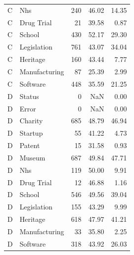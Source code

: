 \begin{tabular}{llrrr}
C & Nhs & 240 & 46.02 & 14.35 \\
C & Drug Trial & 21 & 39.58 & 0.87 \\
C & School & 430 & 52.17 & 29.30 \\
C & Legislation & 761 & 43.07 & 34.04 \\
C & Heritage & 160 & 43.44 & 7.77 \\
C & Manufacturing & 87 & 25.39 & 2.99 \\
C & Software & 448 & 35.59 & 21.25 \\
D & Status & 0 & NaN & 0.00 \\
D & Error & 0 & NaN & 0.00 \\
D & Charity & 685 & 48.79 & 46.94 \\
D & Startup & 55 & 41.22 & 4.73 \\
D & Patent & 15 & 31.58 & 0.93 \\
D & Museum & 687 & 49.84 & 47.71 \\
D & Nhs & 119 & 50.00 & 9.91 \\
D & Drug Trial & 12 & 46.88 & 1.16 \\
D & School & 546 & 49.56 & 39.04 \\
D & Legislation & 155 & 43.29 & 9.99 \\
D & Heritage & 618 & 47.97 & 41.21 \\
D & Manufacturing & 33 & 35.80 & 2.25 \\
D & Software & 318 & 43.92 & 26.03 \\
\bottomrule
\end{tabular}
